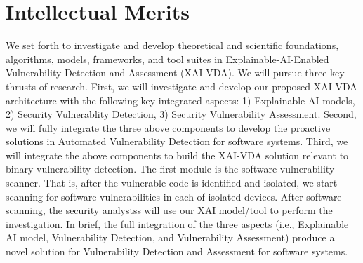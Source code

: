 \documentclass[11pt]{article}
\begin{document}

\section {Intellectual Merits}

We set forth to investigate and develop theoretical and scientific
foundations, algorithms, models, frameworks, and tool suites in
Explainable-AI-Enabled Vulnerability Detection and Assessment
(XAI-VDA). We will pursue three key thrusts of research. First, we
will investigate and develop our proposed XAI-VDA architecture with
the following key integrated aspects: 1) Explainable AI models, 2)
Security Vulnerablity Detection, 3) Security Vulnerability
Assessment. Second, we will fully integrate the three above components
to develop the proactive solutions in Automated Vulnerability
Detection for software systems. Third, we will integrate the above
components to build the XAI-VDA solution relevant to binary
vulnerability detection. The first module is the software
vulnerability scanner.  That is, after the vulnerable code is
identified and isolated, we start scanning for software
vulnerabilities in each of isolated devices.  After software scanning,
the security analystss will use our XAI model/tool to perform the
investigation. In brief, the full integration of the three aspects
(i.e., Explainable AI model, Vulnerability Detection, and
Vulnerability Assessment) produce a novel solution for Vulnerability
Detection and Assessment for software systems.
\end{document}
